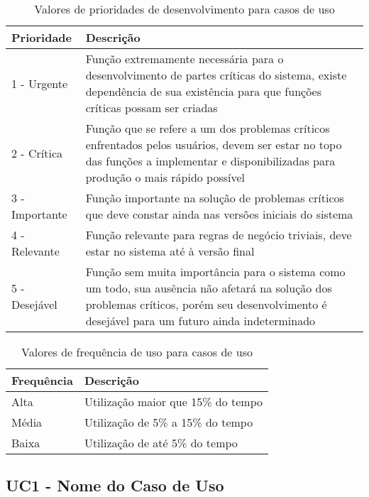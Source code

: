 \documentclass[12pt,openright,a4paper,brazil]{abntex2}
\begin{document}
\begin{table}[!h]
	\caption{Valores de prioridades de desenvolvimento para casos de uso}
	\label{tab:uc-pri}
	\setlength\extrarowheight{5pt}
	\begin{tabular}{p{.2\linewidth}p{.75\linewidth}}
		\hline
		\textbf{Prioridade} & \textbf{Descrição} \\
		\hline
		1 - Urgente & Função extremamente necessária para o desenvolvimento de partes críticas do sistema, existe dependência de sua existência para que funções críticas possam ser criadas \\
		2 - Crítica & Função que se refere a um dos problemas críticos enfrentados pelos usuários, devem ser estar no topo das funções a implementar e disponibilizadas para produção o mais rápido possível \\
		3 - Importante & Função importante na solução de problemas críticos que deve constar ainda nas versões iniciais do sistema \\
		4 - Relevante & Função relevante para regras de negócio triviais, deve estar no sistema até à versão final \\
		5 - Desejável & Função sem muita importância para o sistema como um todo, sua ausência não afetará na solução dos problemas críticos, porém seu desenvolvimento é desejável para um futuro ainda indeterminado \\
		\hline
	\end{tabular}
\end{table}

\begin{table}[h]
	\caption{Valores de frequência de uso para casos de uso}
	\label{tab:uc-freq}
	\setlength\extrarowheight{5pt}
	\begin{tabular}{p{.2\linewidth}p{.75\linewidth}}
		\hline
		\textbf{Frequência} & \textbf{Descrição} \\
		\hline
		Alta & Utilização maior que 15\% do tempo \\
		Média & Utilização de 5\% a 15\% do tempo \\
		Baixa & Utilização de até 5\% do tempo \\
		\hline
	\end{tabular}
\end{table}

\clearpage
\subsection{UC1 - Nome do Caso de Uso}
\end{document}
